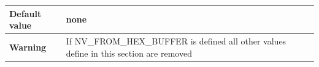 \documentclass{template/openetcs}
\begin{document}
\begin{itemize}
\begin{longtable}{|l|l|}
					\begin{minipage}[t]{0.22\linewidth} \textbf{Default value}	\end{minipage} 
				&	\begin{minipage}[t]{0.78\linewidth} none \end{minipage} \\
				
				\hline
					\begin{minipage}[t]{0.22\linewidth} \textbf{Warning}	\end{minipage} 
				&	\begin{minipage}[t]{0.78\linewidth} If NV\_FROM\_HEX\_BUFFER is defined all other values define in this section are removed\end{minipage} \\
				
				\hline
				
			\end{longtable}
		
	\end{itemize}
	
\end{document}
